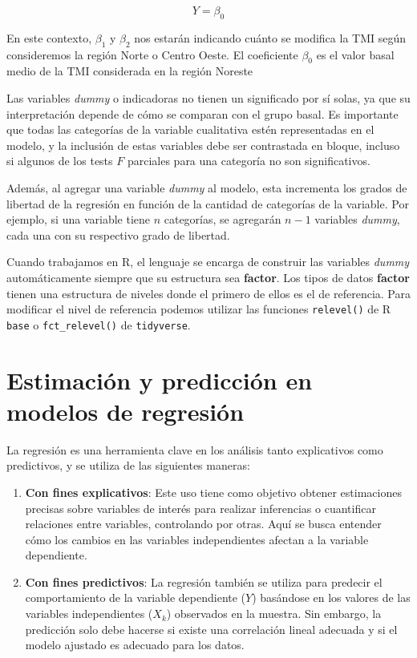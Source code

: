 \documentclass[
  spanish,
  a4paper,
]{scrbook}
\begin{document}
\[ 
Y=\beta_0 
\]

En este contexto, \(\beta_1\) y \(\beta_2\) nos estarán indicando cuánto
se modifica la TMI según consideremos la región Norte o Centro Oeste. El
coeficiente \(\beta_0\) es el valor basal medio de la TMI considerada en
la región Noreste

Las variables \emph{dummy} o indicadoras no tienen un significado por sí
solas, ya que su interpretación depende de cómo se comparan con el grupo
basal. Es importante que todas las categorías de la variable cualitativa
estén representadas en el modelo, y la inclusión de estas variables debe
ser contrastada en bloque, incluso si algunos de los tests \(F\)
parciales para una categoría no son significativos.

Además, al agregar una variable \emph{dummy} al modelo, esta incrementa
los grados de libertad de la regresión en función de la cantidad de
categorías de la variable. Por ejemplo, si una variable tiene \(n\)
categorías, se agregarán \(n-1\) variables \emph{dummy}, cada una con su
respectivo grado de libertad.

Cuando trabajamos en R, el lenguaje se encarga de construir las
variables \emph{dummy} automáticamente siempre que su estructura sea
\textbf{factor}. Los tipos de datos \textbf{factor} tienen una
estructura de niveles donde el primero de ellos es el de referencia.
Para modificar el nivel de referencia podemos utilizar las funciones
\texttt{relevel()} de R \texttt{base} o \texttt{fct\_relevel()} de
\texttt{tidyverse}.

\section{Estimación y predicción en modelos de
regresión}\label{estimaciuxf3n-y-predicciuxf3n-en-modelos-de-regresiuxf3n}

La regresión es una herramienta clave en los análisis tanto explicativos
como predictivos, y se utiliza de las siguientes maneras:

\begin{enumerate}
\def\labelenumi{\arabic{enumi}.}
\item
  \textbf{Con fines explicativos}: Este uso tiene como objetivo obtener
  estimaciones precisas sobre variables de interés para realizar
  inferencias o cuantificar relaciones entre variables, controlando por
  otras. Aquí se busca entender cómo los cambios en las variables
  independientes afectan a la variable dependiente.
\item
  \textbf{Con fines predictivos}: La regresión también se utiliza para
  predecir el comportamiento de la variable dependiente (\(Y\))
  basándose en los valores de las variables independientes (\(X_k\))
  observados en la muestra. Sin embargo, la predicción solo debe hacerse
  si existe una correlación lineal adecuada y si el modelo ajustado es
  adecuado para los datos.
\end{enumerate}
\end{document}

